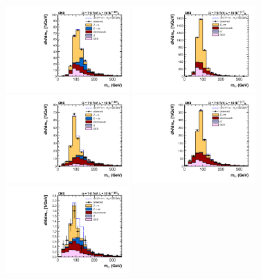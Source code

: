 \documentclass[11pt,twoside,a4paper,cmspaper,final,collab]{cms-tdr}
\begin{document}
\begin{figure}[htbp]
\begin{center}
\includegraphics[width=0.42\textwidth]{figures/htt/eleTau_0jet_rescaled_7and8TeV.pdf}
\includegraphics[width=0.42\textwidth]{figures/htt/muTau_0jet_rescaled_7and8TeV.pdf} \\
\includegraphics[width=0.42\textwidth]{figures/htt/eleTau_boost_rescaled_7and8TeV.pdf}
\includegraphics[width=0.42\textwidth]{figures/htt/muTau_boost_rescaled_7and8TeV.pdf} \\
\includegraphics[width=0.42\textwidth]{figures/htt/eleTau_vbf_rescaled_7and8TeV.pdf}

\end{center}
\end{figure}
\end{document}
